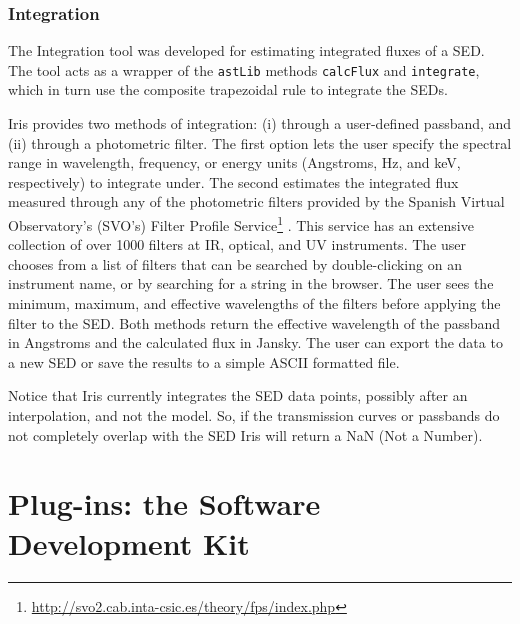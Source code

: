 \documentclass[preprint,authoryear,5p]{elsarticle}
\begin{document}
\subsubsection{Integration}
The Integration tool was developed for
estimating integrated fluxes of a SED. The tool acts as a wrapper of the
\texttt{astLib} methods \texttt{calcFlux} and \texttt{integrate}, which in turn use
the composite trapezoidal rule to integrate the SEDs.

Iris provides two
methods of integration: (i) through a user-defined passband, and (ii) through a
photometric filter. The first option lets the user specify the spectral range in
wavelength, frequency, or energy units (Angstroms, Hz, and keV, respectively) to
integrate under. The second estimates the integrated flux measured through any
of the photometric filters provided by the Spanish Virtual Observatory's (SVO's)
Filter Profile
Service\footnote{\url{http://svo2.cab.inta-csic.es/theory/fps/index.php}}
\citep{2013arXiv1312.3249S}. This service has an extensive collection
of over 1000 filters at IR, optical, and UV
instruments. The user chooses from a list of filters
that can be searched by double-clicking on an instrument name, or by searching
for a string in the browser. The user sees the minimum, maximum, and effective
wavelengths of the filters before applying the filter to the SED.
Both methods return the effective wavelength of the passband in Angstroms and
the calculated flux in Jansky. The user can export the data to a new SED or
save the results to a simple ASCII formatted file.

\begin{sloppypar}
Notice that Iris currently integrates the SED data points, possibly after an interpolation,
and not the model. So, if the transmission curves or passbands do not completely overlap with the SED
Iris will return a NaN (Not a Number).
\end{sloppypar}

\section{Plug-ins: the Software Development Kit} \label{sec:plugins}
\end{document}
